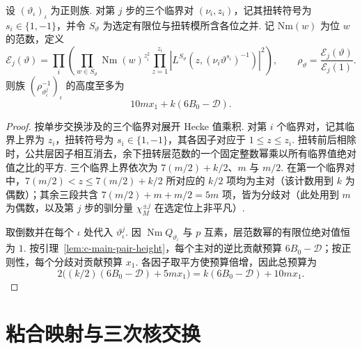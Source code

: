 \begin{lemma}
\label{lem:c-hecke-product-height}
\emitthmsource
设 $(\vartheta_\iota)_\iota$ 为正则族. 对第 $j$ 步的三个临界对 $(\nu_i,z_i)$，记其扭转符号为 $s_i\in\{1,-1\}$，并令 $S_\vartheta$ 为选定有限位与扭转模所含各位之并. 记 $\mathrm{Nm}(w)$ 为位 $w$ 的范数，定义
\[
 \mathcal E_j(\vartheta)=\prod_i
 \left(\prod_{w\in S_\vartheta}\operatorname{Nm}(w)^{z_i^2}
       \prod_{z=1}^{z_i}|L^{S_\vartheta}(z,(\nu_i\vartheta^{s_i})^{-1})|^2\right),
 \qquad \rho_\vartheta=\frac{\mathcal E_j(\vartheta)}{\mathcal E_j(1)}.
\]
则族 $(\rho_{\vartheta_\iota^j}^{-1})_\iota$ 的高度至多为
\[
 10mx_1+k(6B_0-\mathcal D).
\]
\end{lemma}
\begin{proof}
按单步交换涉及的三个临界对展开 Hecke 值乘积. 对第 $i$ 个临界对，记其临界上界为 $z_i$，扭转符号为 $s_i\in\{1,-1\}$，其各因子对应于 $1\le z\le z_i$. 扭转前后相除时，公共层因子相互消去，余下扭转层范数的一个固定整数幂乘以所有临界值绝对值之比的平方. 三个临界上界依次为 $7(m/2)+k/2$、$m$ 与 $m/2$. 在第一个临界对中，$7(m/2)<z\le7(m/2)+k/2$ 所对应的 $k/2$ 项均为主对（该计数用到 $k$ 为偶数）；其余三段共含 $7(m/2)+m+m/2=5m$ 项，皆为分歧对（此处用到 $m$ 为偶数，以及第 $j$ 步的驯分量 $\chi_M^{\pm j}$ 在选定位上非平凡）.

取倒数并在每个 $\iota$ 处代入 $\vartheta_\iota^j$. 因 $\operatorname{Nm}Q_{\vartheta_\iota}$ 与 $p$ 互素，层范数幂的有限位绝对值恒为 $1$. 按引理~\ref{lem:c-main-pair-height}，每个主对的逆比贡献预算 $6B_0-\mathcal D$；按正则性，每个分歧对贡献预算 $x_1$. 各因子取平方使预算倍增，因此总预算为
\[
 2\bigl((k/2)(6B_0-\mathcal D)+5mx_1\bigr)
 =k(6B_0-\mathcal D)+10mx_1 .
\]
\end{proof}

\section{粘合映射与三次核交换}
\label{sec:c-gluing}

